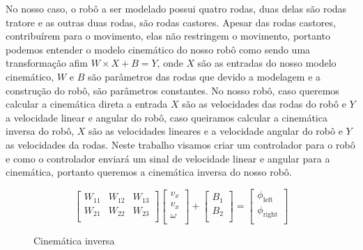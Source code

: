 No nosso caso, o robô a ser modelado possui quatro rodas, duas delas são
rodas tratore e as outras duas rodas, são rodas castores. Apesar das rodas
castores, contribuírem para o movimento, elas não restringem o movimento,
portanto podemos entender o modelo cinemático do nosso robô como sendo
uma transformação afim $W \times X + B = Y$, onde $X$ são as entradas
do nosso modelo cinemático, $W$ e $B$ são parâmetros das
rodas que devido a modelagem e a construção do robô, são parâmetros
constantes. No nosso robô, caso queremos calcular a cinemática direta
a entrada $X$ são as velocidades das rodas do robô e $Y$ a velocidade
linear e angular do robô, caso queiramos calcular a cinemática inversa
do robô, $X$ são as velocidades lineares e a velocidade angular do robô
e $Y$ as velocidades da rodas. Neste trabalho visamos criar um controlador
para o robô e como o controlador enviará um sinal de velocidade linear
e angular para a cinemática, portanto queremos a cinemática inversa
do nosso robô.

\begin{figure}[H]
    \[
    \begin{bmatrix}
        W_{11} &  W_{12} & W_{13} \\
        W_{21} &  W_{22} & W_{23} \\
    \end{bmatrix}
    \begin{bmatrix}
        v_x \\
        v_x \\
        \omega \\
    \end{bmatrix}
    +
    \begin{bmatrix}
        B_{1} \\
        B_{2} \\
    \end{bmatrix}
    =
    \begin{bmatrix}
        \phi_{\text{left}} \\
        \phi_{\text{right}} \\
    \end{bmatrix}
\]
    \caption{Cinemática inversa}
\end{figure}


